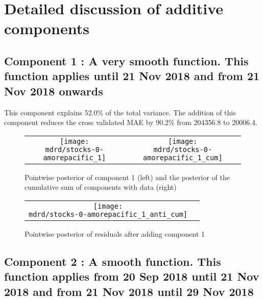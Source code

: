 \documentclass{article} %
\begin{document}
\section{Detailed discussion of additive components}
\label{sec:discussion}

\subsection{Component 1 : A very smooth function. This function applies until 21 Nov 2018 and from 21 Nov 2018 onwards}



This component explains 52.0\% of the total variance.
The addition of this component reduces the cross validated MAE by 90.2\% from 204356.8 to 20006.4.


\begin{figure}[H]
\newcommand{\wmgd}{0.5\columnwidth}
\newcommand{\hmgd}{3.0cm}
\newcommand{\mdrd}{stocks-0-amorepacific}
\newcommand{\mbm}{\hspace{-0.3cm}}
\begin{tabular}{cc}
\mbm \texttt{[image: \\mdrd/stocks-0-amorepacific\_1]} & \texttt{[image: \\mdrd/stocks-0-amorepacific\_1\_cum]}
\end{tabular}
\caption{Pointwise posterior of component 1 (left) and the posterior of the cumulative sum of components with data (right)}
\label{fig:comp1}
\end{figure}

\begin{figure}[H]
\newcommand{\wmgd}{0.5\columnwidth}
\newcommand{\hmgd}{3.0cm}
\newcommand{\mdrd}{stocks-0-amorepacific}
\newcommand{\mbm}{\hspace{-0.3cm}}
\begin{tabular}{cc}
\mbm \texttt{[image: \\mdrd/stocks-0-amorepacific\_1\_anti\_cum]}
\end{tabular}
\caption{Pointwise posterior of residuals after adding component 1}
\label{fig:comp1}
\end{figure}

\subsection{Component 2 : A smooth function. This function applies from 20 Sep 2018 until 21 Nov 2018 and from 21 Nov 2018 until 29 Nov 2018}
\end{document}

